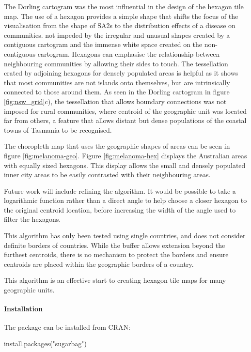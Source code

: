 The Dorling cartogram was the most influential in the design of the
hexagon tile map. The use of a hexagon provides a simple shape that
shifts the focus of the visualisation from the shape of SA2s to the
distribution effects of a disease on communities. not impeded by the
irregular and unusual shapes created by a contiguous cartogram and the
immense white space created on the non-contiguous cartogram. Hexagons
can emphasise the relationship between neighbouring communities by
allowing their sides to touch. The tessellation crated by adjoining
hexagons for densely populated areas is helpful as it shows that most
communities are not islands onto themselves, but are intrinsically
connected to those around them. As seen in the Dorling cartogram in
figure \ref{fig:nsw_grid}c), the tessellation that allows boundary
connections was not imposed for rural communities, where centroid of the
geographic unit was located far from others, a feature that allows
distant but dense populations of the coastal towns of Tasmania to be
recognised.

The choropleth map that uses the geographic shapes of areas can be seen
in figure \ref{fig:melanoma-geo}. Figure \ref{fig:melanoma-hex} displays
the Australian areas with equally sized hexagons. This display allows
the small and densely populated inner city areas to be easily contrasted
with their neighbouring areas.

Future work will include refining the algorithm. It would be possible to
take a logarithmic function rather than a direct angle to help choose a
closer hexagon to the original centroid location, before increasing the
width of the angle used to filter the hexagons.

This algorithm has only been tested using single countries, and does not
consider definite borders of countries. While the buffer allows
extension beyond the furthest centroids, there is no mechanism to
protect the borders and ensure centroids are placed within the
geographic borders of a country.

This algorithm is an effective start to creating hexagon tile maps for
many geographic units.

\hypertarget{installation}{%
\paragraph{Installation}\label{installation}}

The package can be installed from CRAN:

\begin{Schunk}
\begin{Sinput}
install.packages("sugarbag")
\end{Sinput}
\end{Schunk}


